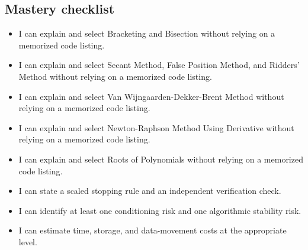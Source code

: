 \documentclass[10pt,letterpaper]{article}
\begin{document}
\subsection*{Mastery checklist}
\begin{itemize}
\item[$\square$] I can explain and select Bracketing and Bisection without relying on a memorized code listing.
\item[$\square$] I can explain and select Secant Method, False Position Method, and Ridders' Method without relying on a memorized code listing.
\item[$\square$] I can explain and select Van Wijngaarden-Dekker-Brent Method without relying on a memorized code listing.
\item[$\square$] I can explain and select Newton-Raphson Method Using Derivative without relying on a memorized code listing.
\item[$\square$] I can explain and select Roots of Polynomials without relying on a memorized code listing.
\item[$\square$] I can state a scaled stopping rule and an independent verification check.
\item[$\square$] I can identify at least one conditioning risk and one algorithmic stability risk.
\item[$\square$] I can estimate time, storage, and data-movement costs at the appropriate level.
\end{itemize}
\end{document}
